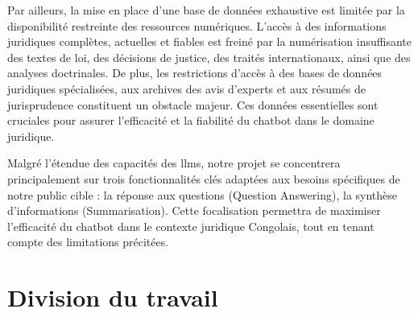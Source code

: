 Par ailleurs, la mise en place d'une base de données exhaustive est limitée par la disponibilité restreinte des ressources numériques. L'accès à des informations juridiques complètes, actuelles et fiables est freiné par la numérisation insuffisante des textes de loi, des décisions de justice, des traités internationaux, ainsi que des analyses doctrinales. De plus, les restrictions d'accès à des bases de données juridiques spécialisées, aux archives des avis d'experts et aux résumés de jurisprudence constituent un obstacle majeur. Ces données essentielles sont cruciales pour assurer l'efficacité et la fiabilité du chatbot dans le domaine juridique.

Malgré l'étendue des capacités des \acfp{llm}, notre projet se concentrera principalement sur trois fonctionnalités clés adaptées aux besoins spécifiques de notre public cible : la réponse aux questions (Question Answering), la synthèse d'informations (Summarisation). Cette focalisation permettra de maximiser l'efficacité du chatbot dans le contexte juridique Congolais, tout en tenant compte des limitations précitées.

\section{Division du travail}
		
